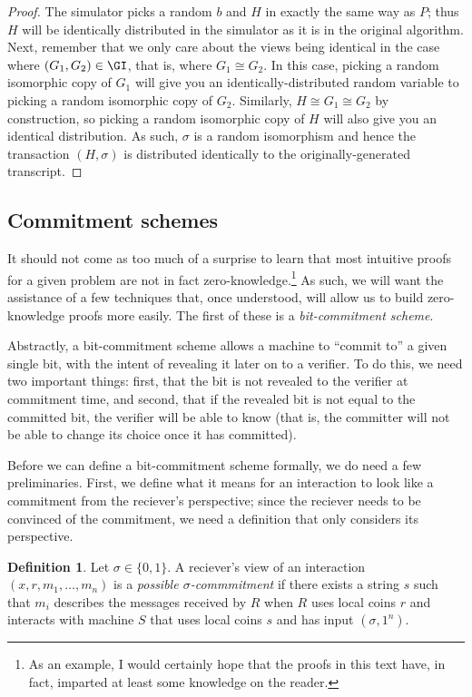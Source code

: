 \documentclass[english,12pt]{reedthesis}
\theoremstyle{plain}
\theoremstyle{definition}
\newtheorem{defn}[defn]{Definition}
\theoremstyle{remark}
\begin{document}
\begin{proof}
  The simulator picks a random $b$ and $H$ in exactly the same way as $P$; thus
  $H$ will be identically distributed in the simulator as it is in the original
  algorithm. Next, remember that we only care about the views being identical in
  the case where $(G_{1}, G_{2}) \in \GI$, that is, where $G_{1} \cong G_{2}$. In this
  case, picking a random isomorphic copy of $G_{1}$ will give you an
  identically-distributed random variable to picking a random isomorphic copy of
  $G_{2}$. Similarly, $H \cong G_{1} \cong G_{2}$ by construction, so picking a random
  isomorphic copy of $H$ will also give you an identical distribution. As such,
  $\sigma$ is a random isomorphism and hence the transaction $(H, \sigma)$ is distributed
  identically to the originally-generated transcript.
\end{proof}

\subsection{Commitment schemes}\label{sec:commitment-scheme}

It should not come as too much of a surprise to learn that most intuitive proofs
for a given problem are not in fact zero-knowledge.\footnote{As an example, I
  would certainly hope that the proofs in this text have, in fact, imparted at
  least some knowledge on the reader.} As such, we will want the assistance of a
few techniques that, once understood, will allow us to build zero-knowledge
proofs more easily. The first of these is a \emph{bit-commitment scheme}.

Abstractly, a bit-commitment scheme allows a machine to ``commit to'' a given
single bit, with the intent of revealing it later on to a verifier. To do this,
we need two important things: first, that the bit is not revealed to the
verifier at commitment time, and second, that if the revealed bit is not equal
to the committed bit, the verifier will be able to know (that is, the committer
will not be able to change its choice once it has committed).

Before we can define a bit-commitment scheme formally, we do need a few
preliminaries. First, we define what it means for an interaction to look like a
commitment from the reciever's perspective; since the reciever needs to be
convinced of the commitment, we need a definition that only considers its
perspective.

\begin{defn}\label{def:possible-commit}
  Let $\sigma \in \{0, 1\}$. A reciever's view of an interaction
  $(x, r, m_{1}, \ldots, m_{n})$ is a \emph{possible $\sigma$-commmitment} if there exists
  a string $s$ such that $m_{i}$ describes the messages received by $R$ when $R$
  uses local coins $r$ and interacts with machine $S$ that uses local coins $s$
  and has input $(\sigma, 1^{n})$.
\end{defn}
\end{document}
